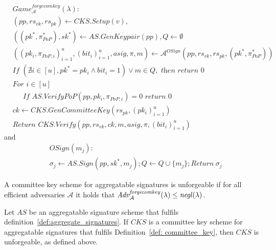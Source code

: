 \begin{align*}
&\mathit{Game}^{\mathit{forgecomkey}}_{\mathcal{A}}({\lambda}): \\
& (\mathit{pp}, \mathit{rs}_{\mathit{vk}},\mathit{rs}_{\mathit{pk}}) \leftarrow \mathit{CKS.Setup}(v), \\
&((\mathit{pk}^*,\pi^*_{\mathit{PoP}}), \mathit{sk}^*) \leftarrow \mathit{AS.GenKeypair}(\mathit{pp}), Q \leftarrow \emptyset \\
& ((\mathit{pk_i}, \pi_{\mathit{PoP},i})_{i=1}^{u}, (\mathit{bit_i})_{i=1}^u, \mathit{asig}, \pi, m) \leftarrow \mathcal{A}^{\mathit{OSign}}(\mathit{pp},\mathit{rs}_{\mathit{vk}},\mathit{rs}_{\mathit{pk}}, (\mathit{pk^*},\pi^*_{\mathit{PoP}})) \\
&\textit{If } (\nexists i  \in [u], \mathit{pk}^* = \mathit{pk_i} \wedge \mathit{bit_i}=1) \vee m \in Q, \textit{ then return } 0 \\
& \textit{For } i \in [u] \\
& \ \ \ \ \ \textit{ If } \mathit{AS.VerifyPoP}(\mathit{pp}, \mathit{pk_i}, \pi_{\mathit{PoP,i}})=0  \textit{ return } 0 \\
& \mathit{ck} \leftarrow \mathit{CKS.GenCommitteeKey}(\mathit{rs}_{\mathit{pk}}, (\mathit{pk_i})_{i=1}^u) \\
& \textit{Return } \mathit{CKS.Verify}(\mathit{pp}, \mathit{rs}_{\mathit{vk}},  \mathit{ck}, m, \mathit{asig}, \pi, (\mathit{bit_i})_{i=1}^u)
\end{align*}
and 
\begin{align*}
& \mathit{OSign}(m_j): \\
& \sigma_j \leftarrow \mathit{AS.Sign}(\mathit{pp}, \mathit{sk}^*, m_j); Q \leftarrow Q \cup \{m_j\}; \textit{Return} \ \sigma_j
\end{align*}

\noindent A committee key scheme for aggregatable signatures is unforgeable if for all efficient adversaries $\mathcal{A}$ it holds that 
$\mathit{Adv}_{\mathcal{A}}^{\mathit{forgecomkey}}(\lambda) \leq \mathit{negl}(\lambda)$.
\begin{corollary} Let $\mathit{AS}$ be an aggregatable signature scheme that fulfils  
definition~\ref{def:aggregate_signatures}. If $\mathit{CKS}$ is a committee key scheme for aggregatable signatures that fulfils Definition~\ref{def: committee_key}, 
then $\mathit{CKS}$ is unforgeable, as defined above.  
\end{corollary}

